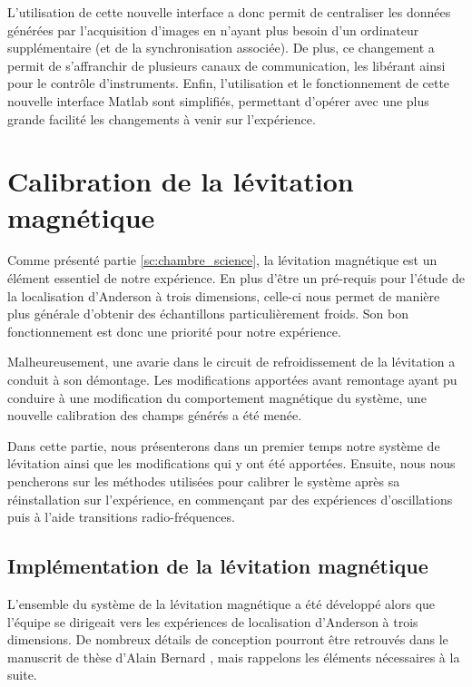 L'utilisation de cette nouvelle interface a donc permit de centraliser les données générées par l'acquisition d'images en n'ayant plus besoin d'un ordinateur supplémentaire (et de la synchronisation associée). De plus, ce changement a permit de s'affranchir de plusieurs canaux de communication, les libérant ainsi pour le contrôle d'instruments. Enfin, l'utilisation et le fonctionnement de cette nouvelle interface Matlab sont simplifiés, permettant d'opérer avec une plus grande facilité les changements à venir sur l'expérience.











\section{Calibration de la lévitation magnétique}
\label{sc:levitation}
Comme présenté partie \ref{sc:chambre_science}, la lévitation magnétique est un élément essentiel de notre expérience. En plus d'être un pré-requis pour l'étude de la localisation d'Anderson à trois dimensions, celle-ci nous permet de manière plus générale d'obtenir des échantillons particulièrement froids. Son bon fonctionnement est donc une priorité pour notre expérience.

Malheureusement, une avarie dans le circuit de refroidissement de la lévitation a conduit à son démontage. Les modifications apportées avant remontage ayant pu conduire à une modification du comportement magnétique du système, une nouvelle calibration des champs générés a été menée.

Dans cette partie, nous présenterons dans un premier temps notre système de lévitation ainsi que les modifications qui y ont été apportées. Ensuite, nous nous pencherons sur les méthodes utilisées pour calibrer le système après sa réinstallation sur l'expérience, en commençant par des expériences d'oscillations puis à l'aide transitions radio-fréquences.




\subsection{Implémentation de la lévitation magnétique}
\label{sc:implementation_levitation}
L'ensemble du système de la lévitation magnétique a été développé alors que l'équipe se dirigeait vers les expériences de localisation d'Anderson à trois dimensions. De nombreux détails de conception pourront être retrouvés dans le manuscrit de thèse d'Alain Bernard \citep{bernard2010transport}, mais rappelons les éléments nécessaires à la suite.

